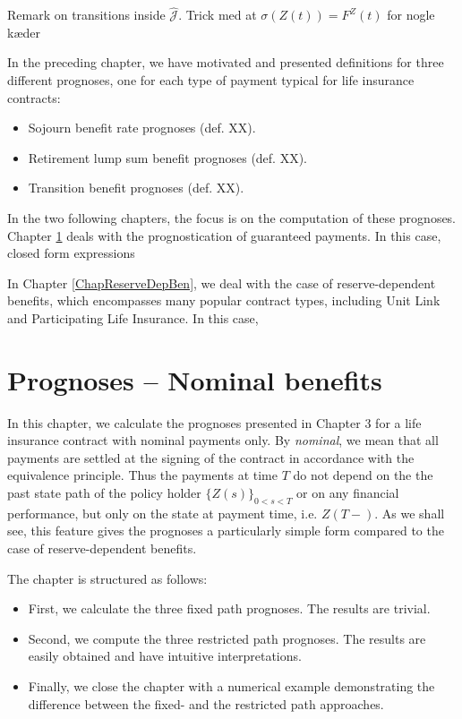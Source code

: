 \documentclass{article}
\newcommand{\1}[1]{\mathbbm{1}_{\left\lbrace #1 \right\rbrace}}
\theoremstyle{break}
\theoremstyle{remark}
\newenvironment{remark}
  {\pushQED{\qed}\renewcommand{\qedsymbol}{\scalebox{1.4}{$\circ$}}\remarkx}
  {\popQED\endremarkx}
\numberwithin{equation}{section}
\begin{document}
\begin{remark}
Remark on transitions inside $\hat{\mathcal{J}}$. Trick med at $\sigma(Z(t))=F^Z(t)$ for nogle kæder
\end{remark}

In the preceding chapter, we have motivated and presented definitions for three different prognoses, one for each type of payment typical for life insurance contracts:

\begin{itemize}
	\item Sojourn benefit rate prognoses (def. XX).
	\item Retirement lump sum benefit prognoses (def. XX).
	\item Transition benefit prognoses (def. XX).
\end{itemize}

In the two following chapters, the focus is on the computation of these prognoses. Chapter \ref{ChapGuaranteedBen} deals with the prognostication of guaranteed payments. In this case, closed form expressions

In Chapter \ref{ChapReserveDepBen}, we deal with the case of reserve-dependent benefits, which encompasses many popular contract types, including Unit Link and Participating Life Insurance. In this case, 

\newpage
\section{Prognoses -- Nominal benefits} \label{ChapGuaranteedBen}

In this chapter, we calculate the prognoses presented in Chapter 3 for a life insurance contract with nominal payments only. By \textit{nominal}, we mean that all payments are settled at the signing of the contract in accordance with the equivalence principle. Thus the payments at time $T$ do not depend on the the past state path of the policy holder $\{ Z(s) \}_{0 < s < T}$ or on any financial performance, but only on the state at payment time,  i.e. $Z(T-)$. As we shall see, this feature gives the prognoses a particularly simple form compared to the case of reserve-dependent benefits.

The chapter is structured as follows:

\begin{itemize}
	\item First, we calculate the three fixed path prognoses. The results are trivial.
	\item Second, we compute the three restricted path prognoses. The results are easily obtained and have intuitive interpretations.
	\item Finally, we close the chapter with a numerical example demonstrating the difference between the fixed- and the restricted path approaches.
\end{itemize}
\end{document}
